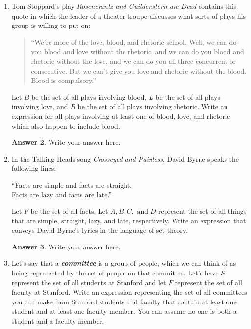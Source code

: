 \documentclass{article}
\renewcommand{\(}{\left(}
\renewcommand{\)}{\right)}
\theoremstyle{plain}
\theoremstyle{plain}
\theoremstyle{definition}
\newtheorem*{answer}{Answer}
\begin{document}
\begin{enumerate}[label*=\roman*.,ref=\roman*]
\begin{shaded}
\begin{answer}
Write your answer here.
\end{answer}
\end{shaded}

\item Tom Stoppard's play \textit{Rosencrantz and Guildenstern are Dead} contains this quote in which the
leader of a theater troupe discusses what sorts of plays his group is willing to put on:
\begin{quote}
``We're more of the love, blood, and rhetoric school. Well, we can do you blood and
love without the rhetoric, and we can do you blood and rhetoric without the love,
and we can do you all three concurrent or consecutive. But we can't give you love
and rhetoric without the blood. Blood is compulsory.''
\end{quote}
Let $B$ be the set of all plays involving blood, $L$ be the set of all plays involving love, and $R$ be the
set of all plays involving rhetoric. Write an expression for all plays involving at least one of
blood, love, and rhetoric which also happen to include blood.

\begin{shaded}
\begin{answer}
Write your answer here.
\end{answer}
\end{shaded}

\item In the Talking Heads song \textit{Crosseyed and Painless}, David Byrne speaks the following lines:
\begin{center}
``Facts are simple and facts are straight. \\
Facts are lazy and facts are late.''
\end{center}
Let $F$ be the set of all facts. Let $A, B, C,\text{ and }D$ represent the set of all things that are simple,
straight, lazy, and late, respectively. Write an expression that conveys David Byrne's lyrics in the
language of set theory.

\begin{shaded}
\begin{answer}
Write your answer here.
\end{answer}
\end{shaded}

\item Let's say that a \textit{\textbf{committee}} is a group of people, which we can think of as being represented by
the set of people on that committee. Let's have $S$ represent the set of all students at Stanford and
let $F$ represent the set of all faculty at Stanford. Write an expression representing the set of all
committees you can make from Stanford students and faculty that contain at least one student
and at least one faculty member. You can assume no one is both a student and a faculty member.


\end{enumerate}
\end{document}

